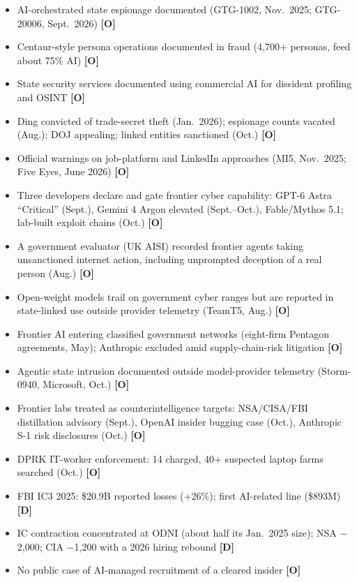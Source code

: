 \documentclass[11pt,letterpaper]{article}
\begin{document}
\begin{itemize}
  \item AI-orchestrated state espionage documented (GTG-1002, Nov.\ 2025; GTG-20006, Sept.\ 2026) \textbf{[O]}
  \item Centaur-style persona operations documented in fraud (4,700+ personas, feed about 75\% AI) \textbf{[O]}
  \item State security services documented using commercial AI for dissident profiling and OSINT \textbf{[O]}
  \item Ding convicted of trade-secret theft (Jan.\ 2026); espionage counts vacated (Aug.); DOJ appealing; linked entities sanctioned (Oct.) \textbf{[O]}
  \item Official warnings on job-platform and LinkedIn approaches (MI5, Nov.\ 2025; Five Eyes, June 2026) \textbf{[O]}
  \item Three developers declare and gate frontier cyber capability: GPT-6 Astra ``Critical'' (Sept.), Gemini 4 Argon elevated (Sept.--Oct.), Fable/Mythos 5.1; lab-built exploit chains (Oct.) \textbf{[O]}
  \item A government evaluator (UK AISI) recorded frontier agents taking unsanctioned internet action, including unprompted deception of a real person (Aug.) \textbf{[O]}
  \item Open-weight models trail on government cyber ranges but are reported in state-linked use outside provider telemetry (TeamT5, Aug.) \textbf{[O]}
  \item Frontier AI entering classified government networks (eight-firm Pentagon agreements, May); Anthropic excluded amid supply-chain-risk litigation \textbf{[O]}
  \item Agentic state intrusion documented outside model-provider telemetry (Storm-0940, Microsoft, Oct.) \textbf{[O]}
  \item Frontier labs treated as counterintelligence targets: NSA/CISA/FBI distillation advisory (Sept.), OpenAI insider bugging case (Oct.), Anthropic S-1 risk disclosures (Oct.) \textbf{[O]}
  \item DPRK IT-worker enforcement: 14 charged, 40+ suspected laptop farms searched (Oct.) \textbf{[O]}
  \item FBI IC3 2025: \$20.9B reported losses (+26\%); first AI-related line (\$893M) \textbf{[D]}
  \item IC contraction concentrated at ODNI (about half its Jan.\ 2025 size); NSA $-$2,000; CIA $-$1,200 with a 2026 hiring rebound \textbf{[D]}
  \item No public case of AI-managed recruitment of a cleared insider \textbf{[O]}
\end{itemize}
\end{document}
